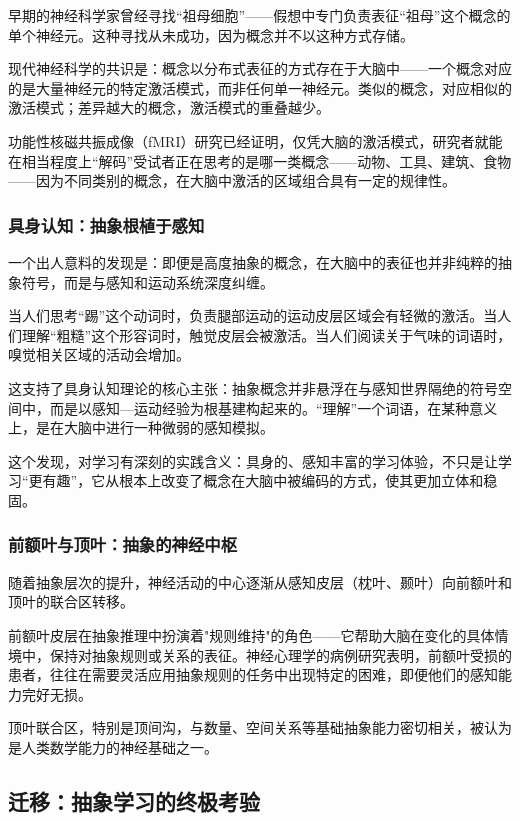 \documentclass[11pt]{article}
\begin{document}
早期的神经科学家曾经寻找“祖母细胞”——假想中专门负责表征“祖母”这个概念的单个神经元。这种寻找从未成功，因为概念并不以这种方式存储。

现代神经科学的共识是：概念以分布式表征的方式存在于大脑中——一个概念对应的是大量神经元的特定激活模式，而非任何单一神经元。类似的概念，对应相似的激活模式；差异越大的概念，激活模式的重叠越少。

功能性核磁共振成像（fMRI）研究已经证明，仅凭大脑的激活模式，研究者就能在相当程度上“解码”受试者正在思考的是哪一类概念——动物、工具、建筑、食物——因为不同类别的概念，在大脑中激活的区域组合具有一定的规律性。
\subsubsection{具身认知：抽象根植于感知}
\label{sec:org1a8480b}

一个出人意料的发现是：即便是高度抽象的概念，在大脑中的表征也并非纯粹的抽象符号，而是与感知和运动系统深度纠缠。

当人们思考“踢”这个动词时，负责腿部运动的运动皮层区域会有轻微的激活。当人们理解“粗糙”这个形容词时，触觉皮层会被激活。当人们阅读关于气味的词语时，嗅觉相关区域的活动会增加。

这支持了具身认知理论的核心主张：抽象概念并非悬浮在与感知世界隔绝的符号空间中，而是以感知—运动经验为根基建构起来的。“理解”一个词语，在某种意义上，是在大脑中进行一种微弱的感知模拟。

这个发现，对学习有深刻的实践含义：具身的、感知丰富的学习体验，不只是让学习“更有趣”，它从根本上改变了概念在大脑中被编码的方式，使其更加立体和稳固。
\subsubsection{前额叶与顶叶：抽象的神经中枢}
\label{sec:org1ae5b8d}

随着抽象层次的提升，神经活动的中心逐渐从感知皮层（枕叶、颞叶）向前额叶和顶叶的联合区转移。

前额叶皮层在抽象推理中扮演着"规则维持"的角色——它帮助大脑在变化的具体情境中，保持对抽象规则或关系的表征。神经心理学的病例研究表明，前额叶受损的患者，往往在需要灵活应用抽象规则的任务中出现特定的困难，即便他们的感知能力完好无损。

顶叶联合区，特别是顶间沟，与数量、空间关系等基础抽象能力密切相关，被认为是人类数学能力的神经基础之一。
\subsection{迁移：抽象学习的终极考验}
\label{sec:orgd4bfbf5}
\end{document}
